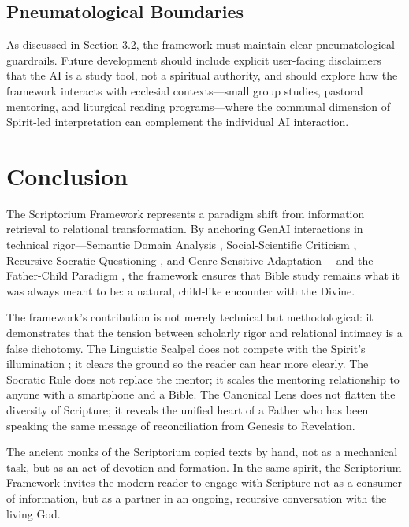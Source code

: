 \subsection{Pneumatological Boundaries}
As discussed in Section 3.2, the framework must maintain clear pneumatological guardrails. Future development should include explicit user-facing disclaimers that the AI is a study tool, not a spiritual authority, and should explore how the framework interacts with ecclesial contexts---small group studies, pastoral mentoring, and liturgical reading programs---where the communal dimension of Spirit-led interpretation \cite{calvin1559} can complement the individual AI interaction.

\section{Conclusion}
The Scriptorium Framework represents a paradigm shift from information retrieval to relational transformation. By anchoring GenAI interactions in technical rigor---Semantic Domain Analysis \cite{louwnida1988}, Social-Scientific Criticism \cite{malina2001}, Recursive Socratic Questioning \cite{qi2023socratic}, and Genre-Sensitive Adaptation \cite{fee2003}---and the Father-Child Paradigm \cite{packer1973,nouwen1992,buber1923}, the framework ensures that Bible study remains what it was always meant to be: a natural, child-like encounter with the Divine.

The framework's contribution is not merely technical but methodological: it demonstrates that the tension between scholarly rigor and relational intimacy is a false dichotomy. The Linguistic Scalpel does not compete with the Spirit's illumination \cite{calvin1559}; it clears the ground so the reader can hear more clearly. The Socratic Rule does not replace the mentor; it scales the mentoring relationship to anyone with a smartphone and a Bible. The Canonical Lens \cite{wright2005} does not flatten the diversity of Scripture; it reveals the unified heart of a Father who has been speaking the same message of reconciliation from Genesis to Revelation.

The ancient monks of the Scriptorium copied texts by hand, not as a mechanical task, but as an act of devotion and formation. In the same spirit, the Scriptorium Framework invites the modern reader to engage with Scripture not as a consumer of information, but as a partner in an ongoing, recursive conversation with the living God.
